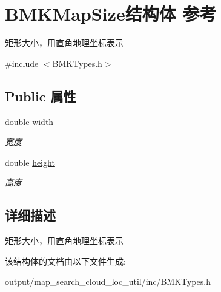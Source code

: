 \hypertarget{struct_b_m_k_map_size}{\section{B\+M\+K\+Map\+Size结构体 参考}
\label{struct_b_m_k_map_size}
}


矩形大小，用直角地理坐标表示  




{\ttfamily \#include $<$B\+M\+K\+Types.\+h$>$}

\subsection*{Public 属性}
\begin{DoxyCompactItemize}
\item 
\hypertarget{struct_b_m_k_map_size_a1005d7fd59045a80619c024df3156d6a}{double \hyperlink{struct_b_m_k_map_size_a1005d7fd59045a80619c024df3156d6a}{width}}\label{struct_b_m_k_map_size_a1005d7fd59045a80619c024df3156d6a}

\begin{DoxyCompactList}\small\item\em 宽度 \end{DoxyCompactList}\item 
\hypertarget{struct_b_m_k_map_size_a516baff78187bf8f07ef49f01c7d86fc}{double \hyperlink{struct_b_m_k_map_size_a516baff78187bf8f07ef49f01c7d86fc}{height}}\label{struct_b_m_k_map_size_a516baff78187bf8f07ef49f01c7d86fc}

\begin{DoxyCompactList}\small\item\em 高度 \end{DoxyCompactList}\end{DoxyCompactItemize}


\subsection{详细描述}
矩形大小，用直角地理坐标表示 

该结构体的文档由以下文件生成\+:\begin{DoxyCompactItemize}
\item 
output/map\+\_\+search\+\_\+cloud\+\_\+loc\+\_\+util/inc/B\+M\+K\+Types.\+h\end{DoxyCompactItemize}
